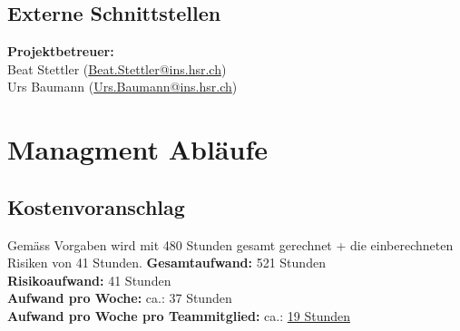 \documentclass[11pt]{scrartcl}
\begin{document}

\subsection{Externe Schnittstellen}
\textbf{Projektbetreuer:} \\
Beat Stettler (\href{mailto:Beat.Stettler@ins.hsr.ch}{Beat.Stettler@ins.hsr.ch})  
\\
Urs Baumann (\href{mailto:Urs.Baumann@ins.hsr.ch}{Urs.Baumann@ins.hsr.ch})


\section{Managment Abläufe}

\subsection{Kostenvoranschlag}
Gemäss Vorgaben wird mit 480 Stunden gesamt gerechnet + die einberechneten 
Risiken von 41 Stunden.
\newline
\textbf{Gesamtaufwand:} 521 Stunden\\
\textbf{Risikoaufwand:} 41 Stunden\\
\textbf{Aufwand pro Woche:} ca.:  37 Stunden\\
\textbf{Aufwand pro Woche pro Teammitglied:} ca.: \uline{19 Stunden}
\end{document}
